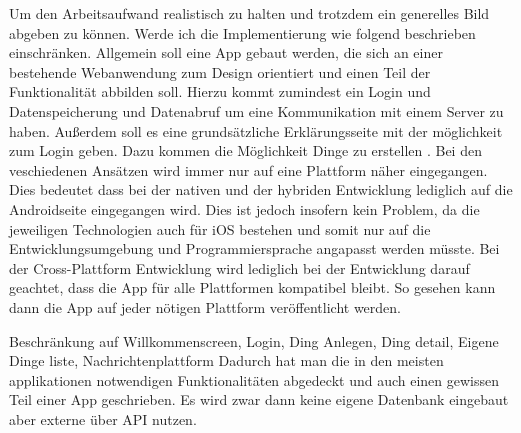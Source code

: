 Um den Arbeitsaufwand realistisch zu halten und trotzdem ein generelles Bild abgeben zu können. Werde ich die Implementierung wie folgend beschrieben einschränken.
Allgemein soll eine App gebaut werden, die sich an einer bestehende Webanwendung zum Design orientiert und einen Teil der Funktionalität abbilden soll.
Hierzu kommt zumindest ein Login und Datenspeicherung und Datenabruf um eine Kommunikation mit einem Server zu haben. Außerdem soll es eine grundsätzliche Erklärungsseite mit der möglichkeit zum Login geben. Dazu kommen die Möglichkeit Dinge zu erstellen
.
Bei den veschiedenen Ansätzen wird immer nur auf eine Plattform näher eingegangen. Dies bedeutet dass bei der nativen und der hybriden Entwicklung lediglich auf die Androidseite eingegangen wird. Dies ist jedoch insofern kein Problem, da die jeweiligen Technologien auch für iOS bestehen und somit nur auf die Entwicklungsumgebung und Programmiersprache angapasst werden müsste. Bei der Cross-Plattform Entwicklung wird lediglich bei der Entwicklung darauf geachtet, dass die App für alle Plattformen kompatibel bleibt. So gesehen kann dann die App auf jeder nötigen Plattform veröffentlicht werden.

Beschränkung auf Willkommenscreen, Login, Ding Anlegen, Ding detail, Eigene Dinge liste, Nachrichtenplattform
Dadurch hat man die in den meisten applikationen notwendigen Funktionalitäten abgedeckt und auch einen gewissen Teil einer App geschrieben. Es wird zwar dann keine eigene Datenbank eingebaut aber externe über API nutzen.